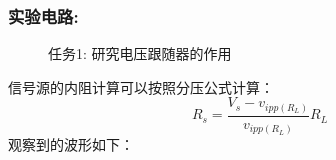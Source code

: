 \documentclass[a4paper,11pt,UTF8]{article}
\begin{document}
\subsubsection{实验电路:}
\begin{figure}[H]
	\centering
	\setcounter{subfigure}{0}
	\caption*{任务1: 研究电压跟随器的作用}
\end{figure}
信号源的内阻计算可以按照分压公式计算：
$$
	R_s=\frac{V_s-v_{ipp(R_L)}}{v_{ipp(R_L)}}R_L
$$
观察到的波形如下：
\end{document}
